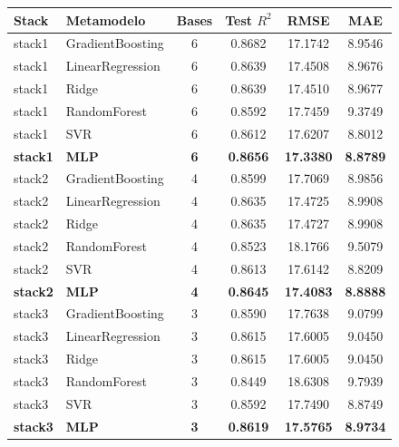 \begin{table}
    \centering
    \small
    \footnotesize
    \begin{tabular}{llcccc}
        \hline
        \textbf{Stack} & \textbf{Metamodelo} & \textbf{Bases} & \textbf{Test $R^2$} & \textbf{RMSE} & \textbf{MAE} \\
        \hline
        stack1 & GradientBoosting & 6 & 0.8682 & 17.1742 & 8.9546 \\
        stack1 & LinearRegression & 6 & 0.8639 & 17.4508 & 8.9676 \\
        stack1 & Ridge            & 6 & 0.8639 & 17.4510 & 8.9677 \\
        stack1 & RandomForest     & 6 & 0.8592 & 17.7459 & 9.3749 \\
        stack1 & SVR              & 6 & 0.8612 & 17.6207 & 8.8012 \\
        \textbf{stack1} & \textbf{MLP} & \textbf{6} & \textbf{0.8656} & \textbf{17.3380} & \textbf{8.8789} \\
        \hline
        stack2 & GradientBoosting & 4 & 0.8599 & 17.7069 & 8.9856 \\
        stack2 & LinearRegression & 4 & 0.8635 & 17.4725 & 8.9908 \\
        stack2 & Ridge            & 4 & 0.8635 & 17.4727 & 8.9908 \\
        stack2 & RandomForest     & 4 & 0.8523 & 18.1766 & 9.5079 \\
        stack2 & SVR              & 4 & 0.8613 & 17.6142 & 8.8209 \\
        \textbf{stack2} & \textbf{MLP} & \textbf{4} & \textbf{0.8645} & \textbf{17.4083} & \textbf{8.8888} \\
        \hline
        stack3 & GradientBoosting & 3 & 0.8590 & 17.7638 & 9.0799 \\
        stack3 & LinearRegression & 3 & 0.8615 & 17.6005 & 9.0450 \\
        stack3 & Ridge            & 3 & 0.8615 & 17.6005 & 9.0450 \\
        stack3 & RandomForest     & 3 & 0.8449 & 18.6308 & 9.7939 \\
        stack3 & SVR              & 3 & 0.8592 & 17.7490 & 8.8749 \\
        \textbf{stack3} & \textbf{MLP} & \textbf{3} & \textbf{0.8619} & \textbf{17.5765} & \textbf{8.9734} \\
        \hline

\end{tabular}
\end{table}
